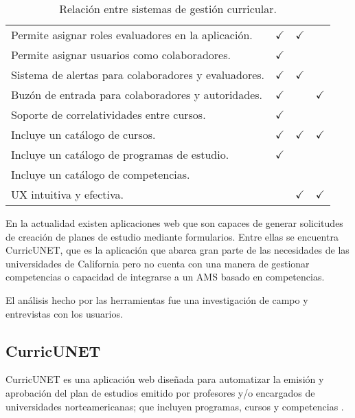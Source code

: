 \begin{table}[H]
\begin{tabular}{lllccl}
\multicolumn{3}{l}{Permite asignar roles evaluadores en la aplicación.}            & $\checkmark$                     & $\checkmark$          &              \\
\multicolumn{3}{l}{Permite asignar usuarios como colaboradores.}                   & $\checkmark$                     &                       &              \\
\multicolumn{3}{l}{Sistema de alertas para colaboradores y evaluadores.}           & $\checkmark$                     & $\checkmark$          &              \\
\multicolumn{3}{l}{Buzón de entrada para colaboradores y autoridades.} 			   & $\checkmark$                     &                       & $\checkmark$ \\
\multicolumn{3}{l}{Soporte de correlatividades entre cursos.}                      & $\checkmark$ 					  &						  &              \\
\multicolumn{3}{l}{Incluye un catálogo de cursos.}                   		   	   & $\checkmark$					  &	$\checkmark$		  & $\checkmark$ \\
\multicolumn{3}{l}{Incluye un catálogo de programas de estudio.}                   & $\checkmark$					  &	            		  &              \\
\multicolumn{3}{l}{Incluye un catálogo de competencias.}                   	       & 								  &						  & 			 \\
\multicolumn{3}{l}{UX intuitiva y efectiva.}     			   					   &                                  & $\checkmark$          & $\checkmark$ \\
\bottomrule
\end{tabular}
\caption{Relación entre sistemas de gestión curricular.}
\label{relacion-sistemas}
\end{table}

En la actualidad existen aplicaciones web que son capaces de generar solicitudes de creación de planes de estudio mediante formularios. Entre ellas se encuentra CurricUNET, que es la aplicación que abarca gran parte de las necesidades de las universidades de California pero no cuenta con una manera de gestionar competencias o capacidad de integrarse a un AMS basado en competencias.

El análisis hecho por las herramientas fue una investigación de campo y entrevistas con los usuarios.

\subsection{CurricUNET}
CurricUNET es una aplicación web diseñada para automatizar la emisión y aprobación del plan de estudios emitido por profesores y/o encargados de universidades norteamericanas; que incluyen programas, cursos y competencias \citep{curricunet_webpage}.

